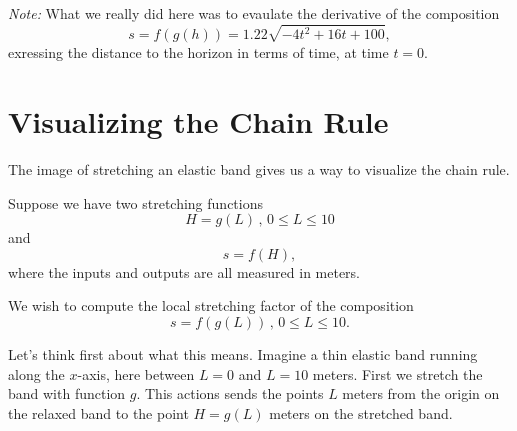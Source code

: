 \documentclass{ximera}
\begin{document}
\begin{example}
\begin{explanation}
\emph{Note:} What we really did here was to evaulate the derivative of the composition
\[
      s = f(g(h)) = 1.22\sqrt{-4t^2 + 16t + 100},
\]
exressing the distance to the horizon in terms of time, at time $t=0$.
\end{explanation}



\end{example}






\section{Visualizing the Chain Rule}

The image of stretching an elastic band gives us a way to visualize the chain rule.

Suppose we have two stretching functions
\[
     H = g(L) \, , \, 0\leq L \leq 10
\]
and
\[
     s = f(H),
\]
where the inputs and outputs are all measured in meters. 

We wish to compute the local stretching factor of the composition 
\[
      s = f(g(L)) \, , \, 0\leq L \leq 10 .
\]

Let's think first about what this means. Imagine a thin elastic band running along the $x$-axis, here between $L=0$ and $L=10$ meters. First we stretch the band with function $g$. This actions sends the points $L$ meters from the origin on the relaxed band to the point $H=g(L)$ meters on the stretched band.
\end{document}
